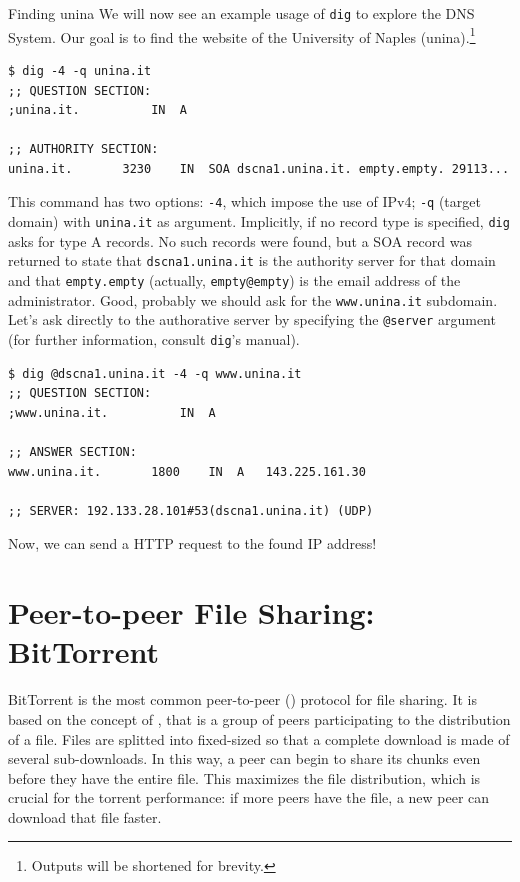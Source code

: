 \begin{example}{Finding unina}
    We will now see an example usage of \texttt{dig} to explore the DNS System. Our goal is to find the website of the University of Naples (unina).\footnote{Outputs will be shortened for brevity.}
    \begin{verbatim}
$ dig -4 -q unina.it
;; QUESTION SECTION:
;unina.it.			IN	A

;; AUTHORITY SECTION:
unina.it.		3230	IN	SOA	dscna1.unina.it. empty.empty. 29113...
    \end{verbatim}
    This command has two options: \texttt{-4}, which impose the use of IPv4; \texttt{-q} (target domain) with \texttt{unina.it} as argument.
    Implicitly, if no record type is specified, \texttt{dig} asks for type A records.
    No such records were found, but a SOA record was returned to state that \texttt{dscna1.unina.it} is the authority server for that domain and that \texttt{empty.empty} (actually, \texttt{empty@empty}) is the email address of the administrator.
    Good, probably we should ask for the \texttt{www.unina.it} subdomain. Let's ask directly to the authorative server by specifying the \texttt{@server} argument (for further information, consult \texttt{dig}'s manual).
    \begin{verbatim}
$ dig @dscna1.unina.it -4 -q www.unina.it
;; QUESTION SECTION:
;www.unina.it.			IN	A

;; ANSWER SECTION:
www.unina.it.		1800	IN	A	143.225.161.30

;; SERVER: 192.133.28.101#53(dscna1.unina.it) (UDP)
    \end{verbatim}
    Now, we can send a HTTP request to the found IP address!
\end{example}

\section{Peer-to-peer File Sharing: BitTorrent}
BitTorrent is the most common peer-to-peer () protocol for file sharing. It is based on the concept of , that is a group of peers participating to the distribution of a file. 
Files are splitted into fixed-sized  so that a complete download is made of several sub-downloads.
In this way, a peer can begin to share its chunks even before they have the entire file.
This maximizes the file distribution, which is crucial for the torrent performance: if more peers have the file, a new peer can download that file faster.

